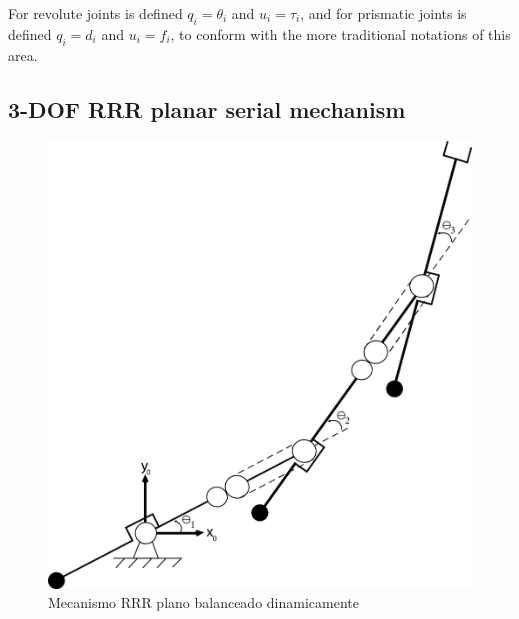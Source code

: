 \documentclass[a4paper,11pt,brazil,fleqn]{article}
\begin{document}
For revolute joints is defined $q_i = \theta_i$ and $u_i = \tau_i$, and for prismatic joints is defined $q_i = d_i$ and $u_i = f_i$, to conform with the more traditional notations of this area.

\subsection{3-DOF RRR planar serial mechanism}\label{S03-1}

\begin{figure}[H]
	\centering
	\includegraphics[scale=0.11]{RRR2D.jpg}  
	\caption{Mecanismo RRR plano balanceado dinamicamente}
	\label{fig:RRR2D}
\end{figure}
\end{document}
